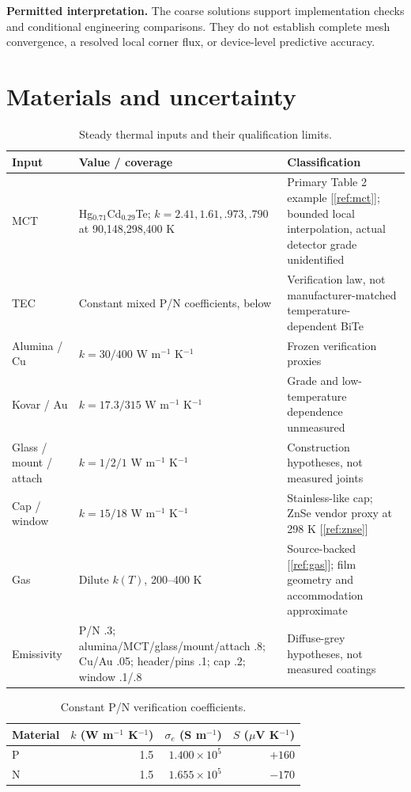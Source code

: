 \documentclass[11pt,a4paper]{article}
\begin{document}
\textbf{Permitted interpretation.} The coarse solutions support implementation
checks and conditional engineering comparisons. They do not establish complete
mesh convergence, a resolved local corner flux, or device-level predictive accuracy.
\clearpage
\section{Materials and uncertainty}
\begin{table}[!ht]\centering\small\caption{Steady thermal inputs and their qualification limits.}
\begin{tabularx}{\linewidth}{p{24mm}XX}\toprule Input & Value / coverage & Classification\\\midrule
MCT & Hg$_{0.71}$Cd$_{0.29}$Te; $k=2.41,1.61,.973,.790$ at 90,148,298,400 K & Primary Table 2 example [\ref{ref:mct}]; bounded local interpolation, actual detector grade unidentified\\
TEC & Constant mixed P/N coefficients, below & Verification law, not manufacturer-matched temperature-dependent BiTe\\
Alumina / Cu & $k=30/400$ W m$^{-1}$ K$^{-1}$ & Frozen verification proxies\\
Kovar / Au & $k=17.3/315$ W m$^{-1}$ K$^{-1}$ & Grade and low-temperature dependence unmeasured\\
Glass / mount / attach & $k=1/2/1$ W m$^{-1}$ K$^{-1}$ & Construction hypotheses, not measured joints\\
Cap / window & $k=15/18$ W m$^{-1}$ K$^{-1}$ & Stainless-like cap; ZnSe vendor proxy at 298 K [\ref{ref:znse}]\\
Gas & Dilute $k(T)$, 200--400 K & Source-backed [\ref{ref:gas}]; film geometry and accommodation approximate\\
Emissivity & P/N .3; alumina/MCT/glass/mount/attach .8; Cu/Au .05; header/pins .1; cap .2; window .1/.8 & Diffuse-grey hypotheses, not measured coatings\\\bottomrule
\end{tabularx}\end{table}
\begin{table}[!ht]\centering\caption{Constant P/N verification coefficients.}
\begin{tabular}{lrrr}\toprule Material & $k$ (W m$^{-1}$ K$^{-1}$) & $\sigma_e$ (S m$^{-1}$) & $S$ ($\mu$V K$^{-1}$)\\\midrule
P & 1.5 & $1.400\times10^5$ & $+160$\\
N & 1.5 & $1.655\times10^5$ & $-170$\\\bottomrule
\end{tabular}\end{table}
\end{document}

